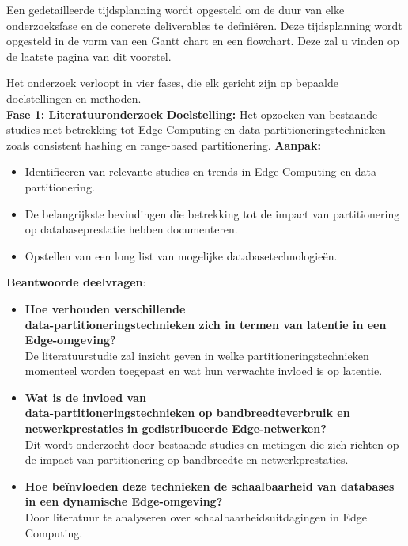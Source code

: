 Een gedetailleerde tijdsplanning wordt opgesteld om de duur van elke onderzoeksfase en de concrete deliverables te definiëren.
Deze tijdsplanning wordt opgesteld in de vorm van een Gantt chart en een flowchart. Deze zal u vinden op de laatste pagina van dit voorstel.

Het onderzoek verloopt in vier fases, die elk gericht zijn op bepaalde doelstellingen en methoden. \\

\textbf{Fase 1: Literatuuronderzoek}\newline\newline
    \textbf{Doelstelling:} Het opzoeken van bestaande studies met betrekking tot Edge Computing en data-partitioneringstechnieken zoals consistent hashing en range-based partitionering.\newline\newline
    \textbf{Aanpak:}
    \begin{itemize}
      \item Identificeren van relevante studies en trends in Edge Computing en data-partitionering.
      \item De belangrijkste bevindingen die betrekking tot de impact van partitionering op databaseprestatie hebben documenteren.
      \item Opstellen van een long list van mogelijke databasetechnologieën.
    \end{itemize}
    \textbf{Beantwoorde deelvragen}:
    \begin{itemize}
    \item \textbf{Hoe verhouden verschillende \vspace{0em}\\ data-partitioneringstechnieken zich in termen van latentie in een Edge-omgeving?} \\
      De literatuurstudie zal inzicht geven in welke partitioneringstechnieken momenteel worden toegepast en wat hun verwachte invloed is op latentie.
    \item \textbf{Wat is de invloed van \vspace{0em}\\ data-partitioneringstechnieken op bandbreedteverbruik en netwerkprestaties in gedistribueerde Edge-netwerken?} \\
      Dit wordt onderzocht door bestaande studies en metingen die zich richten op de impact van partitionering op bandbreedte en netwerkprestaties.
    \item \textbf{Hoe beïnvloeden deze technieken de schaalbaarheid van databases in een dynamische Edge-omgeving?} \\
      Door literatuur te analyseren over schaalbaarheidsuitdagingen in Edge Computing.
    \end{itemize}
